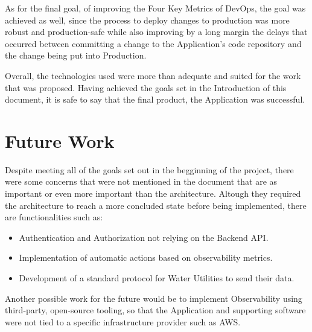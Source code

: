 As for the final goal, of improving the Four Key Metrics of DevOps, the goal was achieved as well, since the process to deploy changes to production was more robust and production-safe while also improving by a long margin the delays that occurred between committing a change to the Application's code repository and the change being put into Production. 

Overall, the technologies used were more than adequate and suited for the work that was proposed. Having achieved the goals set in the Introduction of this document, it is safe to say that the final product, the Application was successful.

\section{Future Work}\label{conclusion:s:future-work}

Despite meeting all of the goals set out in the begginning of the project, there were some concerns that were not mentioned in the document that are as important or even more important than the architecture. 
Altough they required the architecture to reach a more concluded state before being implemented, there are functionalities such as:

\begin{itemize}
    \item Authentication and Authorization not relying on the Backend API.
    \item Implementation of automatic actions based on observability metrics.
    \item Development of a standard protocol for Water Utilities to send their data.
\end{itemize}

Another possible work for the future would be to implement Observability using third-party, open-source tooling, so that the Application and supporting software were not tied to a specific infrastructure provider such as AWS. 